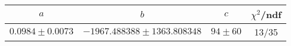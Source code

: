 \begin{tabular}{c|c|c|c}
$a$ & $b$ & $c$ & $\chi^2$/ndf \\
\hline
$0.0984\pm0.0073$ & $-1967.488388\pm1363.808348$ & $94\pm60$ & 13/35
\end{tabular}
